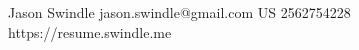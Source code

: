\profile
    {Jason Swindle}
    {jason.swindle@gmail.com}
    {US}
    {2562754228}
    {https://resume.swindle.me}